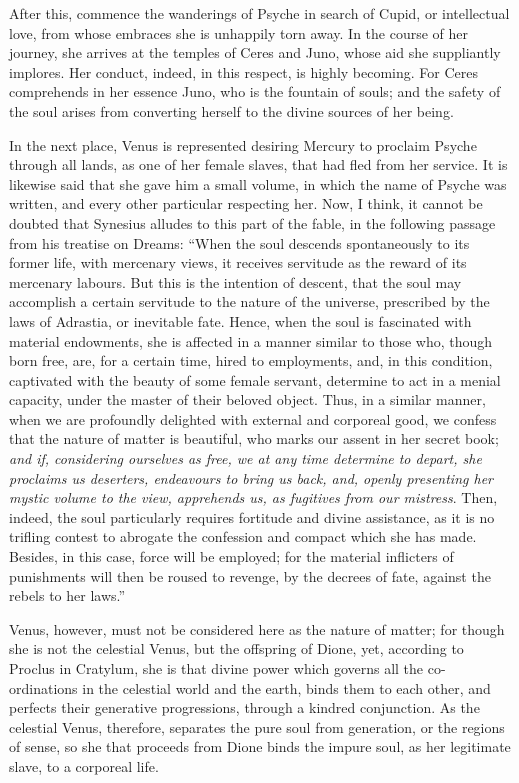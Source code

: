 \documentclass[12pt]{article}
\begin{document}
{After this, commence the wanderings of Psyche in search of Cupid, or
intellectual love, from whose embraces she is unhappily torn away. In the
course of her journey, she arrives at the temples of Ceres and Juno, whose aid
she suppliantly implores. Her conduct, indeed, in this respect, is highly
becoming. For Ceres comprehends in her essence Juno, who is the fountain of
souls; and the safety of the soul arises from converting herself to the divine
sources of her being.

In the next place, Venus is represented desiring Mercury to proclaim Psyche
through all lands, as one of her female slaves, that had fled from her service.
It is likewise said that she gave him a small volume, in which the name of
Psyche was written, and every other particular respecting her. Now, I think, it
cannot be doubted that Synesius alludes to this part of the fable, in the
following passage from his treatise on Dreams: ``When the soul descends
spontaneously to its former life, with mercenary views, it receives servitude
as the reward of its mercenary labours. But this is the intention of descent,
that the soul may accomplish a certain servitude to the nature of the universe,
prescribed by the laws of Adrastia, or inevitable fate. Hence, when the soul is
fascinated with material endowments, she is affected in a manner similar to
those who, though born free, are, for a certain time, hired to employments,
and, in this condition, captivated with the beauty of some female servant,
determine to act in a menial capacity, under the master of their beloved
object. Thus, in a similar manner, when we are profoundly delighted with
external and corporeal good, we confess that the nature of matter is beautiful,
who marks our assent in her secret book; \textit{and if, considering ourselves
as free, we at any time determine to depart, she proclaims us deserters,
endeavours to bring us back, and, openly presenting her mystic volume to the
view, apprehends us, as fugitives from our mistress}. Then, indeed, the soul
particularly requires fortitude and divine assistance, as it is no trifling
contest to abrogate the confession and compact which she has made. Besides, in
this case, force will be employed; for the material inflicters of punishments
will then be roused to revenge, by the decrees of fate, against the rebels to
her laws.''

Venus, however, must not be considered here as the nature of matter; for though
she is not the celestial Venus, but the offspring of Dione, yet, according to
Proclus in Cratylum, she is that divine power which governs all the
co-ordinations in the celestial world and the earth, binds them to each other,
and perfects their generative progressions, through a kindred conjunction. As
the celestial Venus, therefore, separates the pure soul from generation, or the
regions of sense, so she that proceeds from Dione binds the impure soul, as her
legitimate slave, to a corporeal life.

}
\end{document}
